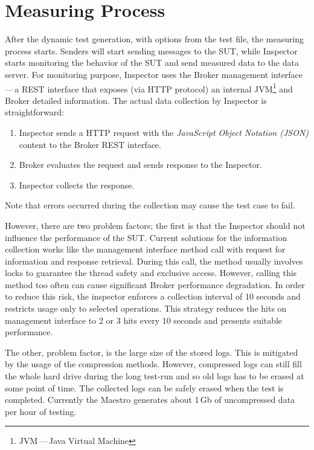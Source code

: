 \section{Measuring Process}
\label{Measuring Process}
After the dynamic test generation, with options from the test file, the measuring process starts. Senders will start sending messages to the SUT, while Inspector starts monitoring the behavior of the SUT and send measured data to the data server. For monitoring purpose, Inspector uses the Broker management interface\,---\,a REST interface that exposes (via HTTP protocol) an internal JVM\footnote{JVM\,---\,Java Virtual Machine} and Broker detailed information. The actual data collection by Inspector is straightforward:

\begin{enumerate}
	\setlength\itemsep{0em}
	\item Inspector sends a HTTP request with the \emph{JavaScript Object Notation\footnotemark{} (JSON)} content to the Broker REST interface.
	\item Broker evaluates the request and sends response to the Inspector.
	\item Inspector collects the response.
\end{enumerate}
Note that errors occurred during the collection may cause the test case to fail.


However, there are two problem factors; the first is that the Inspector should not influence the performance of the SUT. Current solutions for the information collection works like the management interface method call with request for information and response retrieval. During this call, the method usually involves locks to guarantee the thread safety and exclusive access. However, calling this method too often can cause significant Broker performance degradation. In order to reduce this risk, the inspector enforces a collection interval of 10 seconds and restricts usage only to selected operations. This strategy reduces the hits on management interface to 2 or 3 hits every 10 seconds and presents suitable performance.

The other, problem factor, is the large size of the stored logs. This is mitigated by the usage of the compression methods. However, compressed logs can still fill the whole hard drive during the long test-run and so old logs has to be erased at some point of time. The collected logs can be safely erased when the test is completed. Currently the Maestro generates about 1\,Gb of uncompressed data per hour of testing.

